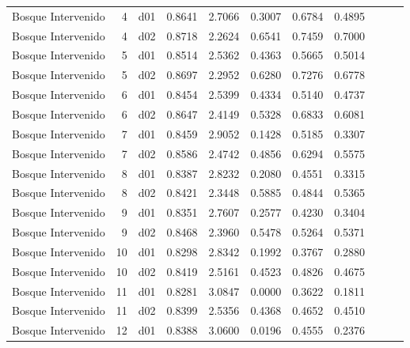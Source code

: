 \begin{landscape}
\begin{longtable}{p{2cm}rrrrrrrrrr}
    Bosque Intervenido    &          4 &     d01 &   0.8641 &  2.7066 &        0.3007 &           0.6784 &  0.4895 \\
    Bosque Intervenido    &          4 &     d02 &   0.8718 &  2.2624 &        0.6541 &           0.7459 &  0.7000 \\
    Bosque Intervenido    &          5 &     d01 &   0.8514 &  2.5362 &        0.4363 &           0.5665 &  0.5014 \\
    Bosque Intervenido    &          5 &     d02 &   0.8697 &  2.2952 &        0.6280 &           0.7276 &  0.6778 \\
    Bosque Intervenido    &          6 &     d01 &   0.8454 &  2.5399 &        0.4334 &           0.5140 &  0.4737 \\
    Bosque Intervenido    &          6 &     d02 &   0.8647 &  2.4149 &        0.5328 &           0.6833 &  0.6081 \\
    Bosque Intervenido    &          7 &     d01 &   0.8459 &  2.9052 &        0.1428 &           0.5185 &  0.3307 \\
    Bosque Intervenido    &          7 &     d02 &   0.8586 &  2.4742 &        0.4856 &           0.6294 &  0.5575 \\
    Bosque Intervenido    &          8 &     d01 &   0.8387 &  2.8232 &        0.2080 &           0.4551 &  0.3315 \\
    Bosque Intervenido    &          8 &     d02 &   0.8421 &  2.3448 &        0.5885 &           0.4844 &  0.5365 \\
    Bosque Intervenido    &          9 &     d01 &   0.8351 &  2.7607 &        0.2577 &           0.4230 &  0.3404 \\
    Bosque Intervenido    &          9 &     d02 &   0.8468 &  2.3960 &        0.5478 &           0.5264 &  0.5371 \\
    Bosque Intervenido    &         10 &     d01 &   0.8298 &  2.8342 &        0.1992 &           0.3767 &  0.2880 \\
    Bosque Intervenido    &         10 &     d02 &   0.8419 &  2.5161 &        0.4523 &           0.4826 &  0.4675 \\
    Bosque Intervenido    &         11 &     d01 &   0.8281 &  3.0847 &        0.0000 &           0.3622 &  0.1811 \\
    Bosque Intervenido    &         11 &     d02 &   0.8399 &  2.5356 &        0.4368 &           0.4652 &  0.4510 \\
    Bosque Intervenido    &         12 &     d01 &   0.8388 &  3.0600 &        0.0196 &           0.4555 &  0.2376 \\

\end{longtable}
\end{landscape}
